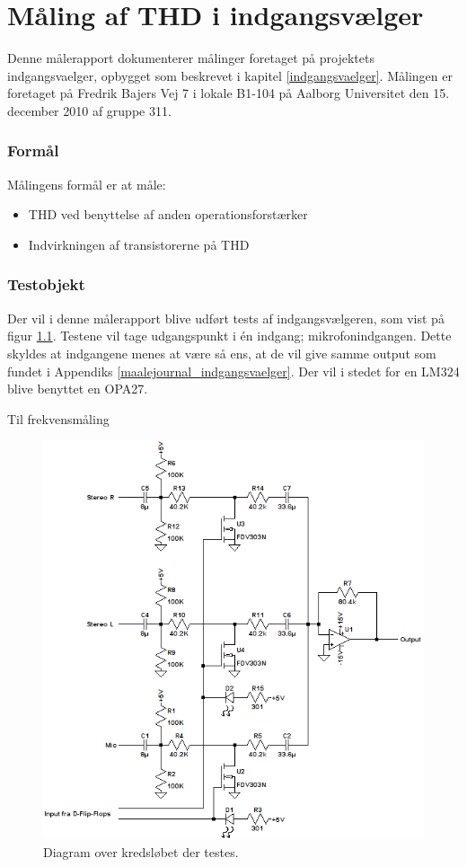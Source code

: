 \chapter{Måling af THD i indgangsvælger}
\label{maalejournal_indgangsvaelger_2}

Denne målerapport dokumenterer målinger foretaget på projektets indgangsvaelger, opbygget som beskrevet i kapitel \ref{indgangsvaelger}. Målingen er foretaget på Fredrik Bajers Vej 7 i lokale B1-104 på Aalborg Universitet den 15. december 2010 af gruppe 311.

\subsection*{Formål}
Målingens formål er at måle:
\begin{itemize}
\item THD ved benyttelse af anden operationsforstærker
\item Indvirkningen af transistorerne på THD
\end{itemize}

\subsection*{Testobjekt}
Der vil i denne målerapport blive udført tests af indgangsvælgeren, som vist på figur \ref{maalerap_diagram_simulering}. Testene vil tage udgangspunkt i én indgang; mikrofonindgangen. Dette skyldes at indgangene menes at være så ens, at de vil give samme output som fundet i Appendiks \ref{maalejournal_indgangsvaelger}. Der vil i stedet for en LM324 blive benyttet en OPA27.

Til frekvensmåling 
\begin{figure}[h]
\centering
\includegraphics[scale=0.8]{maalerapporter/indgangsvaelger/indgangvaelger_ltspice_diagram.png}
\caption{Diagram over kredsløbet der testes.}
\label{maalerap_diagram_simulering}
\end{figure}


